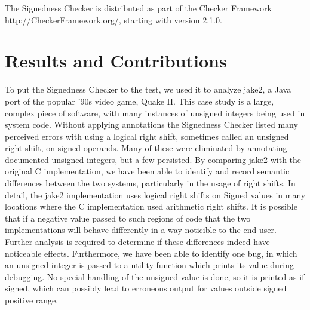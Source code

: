 \documentclass{sig-alternate-05-2015}
\begin{document}
The Signedness Checker is distributed as part of the Checker Framework
\url{http://CheckerFramework.org/}, starting with version 2.1.0.


\section{Results and Contributions}

To put the Signedness Checker to the test, we used it to analyze jake2, a Java port of the popular '90s video game, Quake II. This case study is a large, complex piece of software, with many instances of unsigned integers being used in system code. Without applying annotations the Signedness Checker listed many perceived errors with using a logical right shift, sometimes called an unsigned right shift, on signed operands. Many of these were eliminated by annotating documented unsigned integers, but a few persisted. By comparing jake2 with the original C implementation, we have been able to identify and record semantic differences between the two systems, particularly in the usage of right shifts. In detail, the jake2 implementation uses logical right shifts on Signed values in many locations where the C implementation used arithmetic right shifts. It is possible that if a negative value passed to such regions of code that the two implementations will behave differently in a way noticible to the end-user. Further analysis is required to determine if these differences indeed have noticeable effects. Furthermore, we have been able to identify one bug, in which an unsigned integer is passed to a utility function which prints its value during debugging. No special handling of the unsigned value is done, so it is printed as if signed, which can possibly lead to erroneous output for values outside signed positive range.



\end{document}
